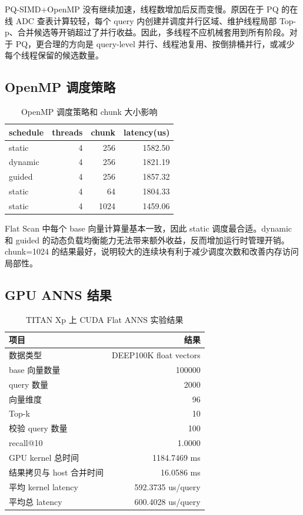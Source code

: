 \documentclass[UTF8,a4paper,10pt]{ctexart}
\begin{document}
PQ-SIMD+OpenMP 没有继续加速，线程数增加后反而变慢。原因在于 PQ 的在线 ADC 查表计算较轻，每个 query 内创建并调度并行区域、维护线程局部 Top-p、合并候选等开销超过了并行收益。因此，多线程不应机械套用到所有阶段。对于 PQ，更合理的方向是 query-level 并行、线程池复用、按倒排桶并行，或减少每个线程保留的候选数量。

\subsection{OpenMP 调度策略}

\begin{table}[H]
\centering
\caption{OpenMP 调度策略和 chunk 大小影响}
\label{tab:schedule_results}
\begin{tabular}{lrrr}
\toprule
schedule & threads & chunk & latency(us) \\
\midrule
static & 4 & 256 & 1582.50 \\
dynamic & 4 & 256 & 1821.19 \\
guided & 4 & 256 & 1857.32 \\
static & 4 & 64 & 1804.33 \\
static & 4 & 1024 & 1459.06 \\
\bottomrule
\end{tabular}
\end{table}

Flat Scan 中每个 base 向量计算量基本一致，因此 static 调度最合适。dynamic 和 guided 的动态负载均衡能力无法带来额外收益，反而增加运行时管理开销。chunk=1024 的结果最好，说明较大的连续块有利于减少调度次数和改善内存访问局部性。

\subsection{GPU ANNS 结果}

\begin{table}[H]
\centering
\caption{TITAN Xp 上 CUDA Flat ANNS 实验结果}
\label{tab:gpu_ann_results}
\begin{tabular}{lr}
\toprule
项目 & 结果 \\
\midrule
数据类型 & DEEP100K float vectors \\
base 向量数量 & 100000 \\
query 数量 & 2000 \\
向量维度 & 96 \\
Top-k & 10 \\
校验 query 数量 & 100 \\
recall@10 & 1.0000 \\
GPU kernel 总时间 & 1184.7469 ms \\
结果拷贝与 host 合并时间 & 16.0586 ms \\
平均 kernel latency & 592.3735 us/query \\
平均总 latency & 600.4028 us/query \\
\bottomrule
\end{tabular}
\end{table}
\end{document}
